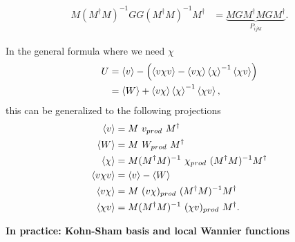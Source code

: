 \documentclass[12pt,a4paper]{scrartcl}
\numberwithin{equation}{section}
\begin{document}
\begin{align}
  M ( M^{\dagger} M )^{-1} GG ( M^{\dagger} M )^{-1} M^{\dagger} &= \underbrace{ M G M^{\dagger} M G M^{\dagger} }_{P_{ijkl}}.
\end{align}

In the general formula where we need  $\chi$
\begin{align}
 U &= \braket{v} - \left( \braket{v \chi v} - \braket{v\chi} \braket{\chi}^{-1} \braket{\chi v} \right) \\
   &= \braket{W} + \braket{v\chi} \braket{\chi}^{-1} \braket{\chi v}  ,
\end{align}
this can be generalized to the following projections
\begin{align}
\braket{v} &= M\ v_{prod} \ M^{\dagger} \\
 \braket{W} &= M\ W_{prod} \ M^{\dagger} \\
 \braket{\chi} &= M ( M^{\dagger} M )^{-1} \ \chi_{prod} \ ( M^{\dagger} M )^{-1} M^{\dagger}\\
 \braket{v\chi v} &= \braket{v}-\braket{W}\\
 \braket{v \chi} &= M\  (v \chi)_{prod} \ ( M^{\dagger} M )^{-1} M^{\dagger} \\
 \braket{\chi v} &= M ( M^{\dagger} M )^{-1}\  (\chi v)_{prod} \ M^{\dagger}.
\end{align}

\textbf{In practice: Kohn-Sham basis and local Wannier functions}
\end{document}

